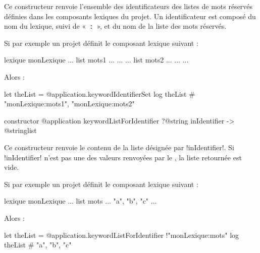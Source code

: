 Ce constructeur renvoie l'ensemble des identificateurs des listes de mots réservés définies dans les composants lexiques du projet. Un identificateur est composé du nom du lexique, suivi de «~\texttt{:}~», et du nom de la liste des mots réservés.


Si par exemple un projet définit le composant lexique suivant :

\begin{galgas4}
lexique monLexique {
  ...
  list mots1 ... { ... }
  ...
  list mots2 ... { ... }
  ...
}
\end{galgas4}

Alors :
\begin{galgas4}
let theList = @application.keywordIdentifierSet
log theList # "monLexique:mots1", "monLexique:mots2"
\end{galgas4}






\begin{galgas4box}
constructor @application keywordListForIdentifier
  ?@string inIdentifier
  -> @stringlist
\end{galgas4box}


Ce constructeur renvoie le contenu de la liste désignée par \ggsq!inIdentifier!. Si \ggsq!inIdentifier! n'est pas une des valeurs renvoyées par le , la liste retournée est vide.


Si par exemple un projet définit le composant lexique suivant :

\begin{galgas4}
lexique monLexique {
  ...
  list mots ... { "a", "b", "c" }
  ...
}
\end{galgas4}

Alors :
\begin{galgas4}
let theList = @application.keywordListForIdentifier {!"monLexique:mots"}
log theList # "a", "b", "c"
\end{galgas4}


